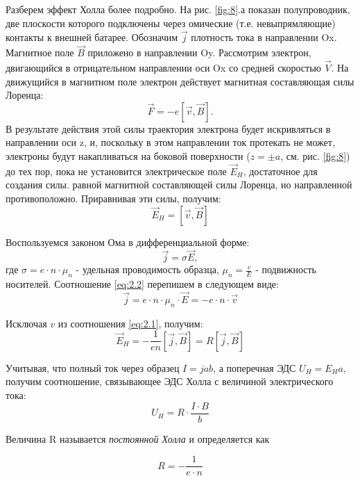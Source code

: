 Разберем эффект Холла более подробно. На рис. \ref{fig:8}.а показан полупроводник, две плоскости которого подключены через омические (т.е. невыпрямляющие) контакты к внешней батарее. Обозначим $\vec j$ плотность тока в направлении Ox. Магнитное поле $\vec B$ приложено в направлении Oy. Рассмотрим электрон, двигающийся в отрицательном направлении оси Ox со средней скоростью $\vec V$. На движущийся в магнитном поле электрон действует магнитная составляющая силы Лоренца:
$$\vec F = -e [\vec v, \vec B].$$
В результате действия этой силы траектория электрона будет искривляться  в направлении оси z, и, поскольку в этом направлении ток протекать не может, электроны будут накапливаться на боковой поверхности ($z=\pm a$, см. рис. \ref{fig:8}) до тех пор, пока не установится электрическое поле $\vec E_H$, достаточное для создания силы. равной магнитной составляющей силы Лоренца, но направленной противоположно. Приравнивая эти силы, получим: 
\begin{equation}
\label{eq:2.1}
	\vec E_H=[\vec v, \vec B]
\end{equation}

Воспользуемся законом Ома в дифференциальной форме:
\begin{equation}
\label{eq:2.2}
	\vec j = \sigma \vec E,
\end{equation}
где $\sigma = e \cdot n \cdot \mu_n$ - удельная проводимость образца, $\mu_n = \frac{v}{E}$ - подвижность носителей. Соотношение \eqref{eq:2.2} перепишем в следующем виде:
\begin{equation}
\label{eq:2.3}
	\vec j = e \cdot n \cdot \mu_n \cdot \vec E = -e \cdot n \cdot \vec v
\end{equation}

Исключая $v$ из соотношения \eqref{eq:2.1}, получим:
\begin{equation}
\label{eq:2.4}
	\vec E_H = -\frac{1}{en} [\vec j, \vec B]=R[\vec j, \vec B]
\end{equation}

Учитывая, что полный ток через образец $I=jab$, а поперечная ЭДС $U_H=E_Ha$, получим соотношение, связывающее ЭДС Холла с величиной электрического тока:
\begin{equation}
\label{eq:2.5}
	U_H=R \cdot \frac{I\cdot B}{b}
\end{equation}

Величина R называется \textit{постоянной Холла} и определяется как

\begin{equation}
\label{eq:2.6}
	R=-\frac{1}{e\cdot n}
\end{equation}

